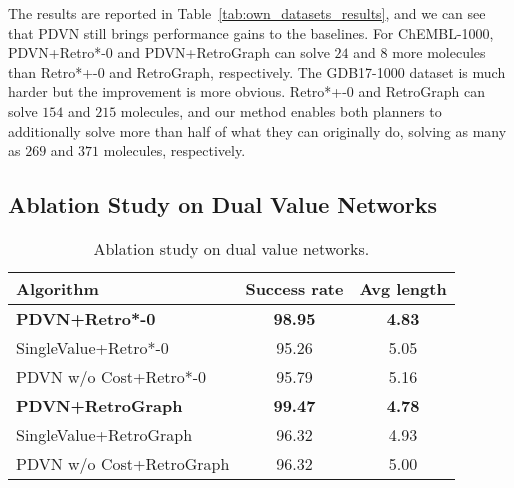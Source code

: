 \documentclass[nohyperref]{article}
\theoremstyle{plain}
\theoremstyle{definition}
\theoremstyle{remark}
\begin{document}
The results are reported in Table~\ref{tab:own_datasets_results}, and we can see that PDVN still brings performance gains to the baselines. For ChEMBL-1000, PDVN+Retro*-0 and PDVN+RetroGraph can solve $24$ and $8$ more molecules than Retro*+-0 and RetroGraph, respectively. The GDB17-1000 dataset is much harder but the improvement is more obvious. Retro*+-0 and RetroGraph can solve $154$ and $215$ molecules, and our method enables both planners to additionally solve more than half of what they can originally do, solving as many as $269$ and $371$ molecules, respectively.

\begin{table}[t]
\caption{Number of solved target molecules on ChEMBL-100 dataset and GDB17-1000 datasets.}
\label{tab:own_datasets_results}
\centering
{}
\end{table}




\subsection{Ablation Study on Dual Value Networks}

\begin{table}[t]
\caption{Ablation study on dual value networks. 
}
\label{tab:ablation_study}
\centering
\resizebox{\columnwidth}{!} {\begin{tabular}{l c c}
    \toprule
Algorithm & Success rate & Avg length \\
    \midrule
\textbf{PDVN+Retro*-0} & \textbf{98.95} & \textbf{4.83}  \\
    SingleValue+Retro*-0 & 95.26 & 5.05  \\
PDVN w/o Cost+Retro*-0 & 95.79 & 5.16  \\
    \midrule
\textbf{PDVN+RetroGraph} & \textbf{99.47} & \textbf{4.78} \\
    SingleValue+RetroGraph & 96.32 & 4.93  \\
    PDVN w/o Cost+RetroGraph & 96.32 & 5.00  \\
    \bottomrule
\end{tabular}}
\end{table}
\end{document}
